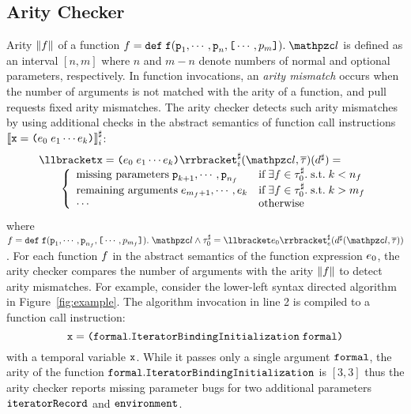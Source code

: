 \subsection{Arity Checker}

Arity $\lVert{f}\rVert$ of a function $\func = \kwdef \; \f (\p_1, \cdots, \p_n,
\kwsl \cdots, p_m \kwsr). \; \lab$ is defined as an interval $[n, m]$ where $n$
and $m-n$ denote numbers of normal and optional parameters, respectively.  In
function invocations, an \textit{arity mismatch} occurs when the number of
arguments is not matched with the arity of a function, and  pull
requests fixed  arity mismatches.  The arity checker detects such
arity mismatches by using additional checks in the abstract semantics of
function call instructions ${\llbracket{\texttt{x}= \texttt{(}e_0 \; e_1 \cdots e_k
\texttt{)}}\rrbracket}^\sharp_i$:
\[
  \begin{array}{l}
    \asemi{\x = \kwrl \expr_0 \; \expr_1 \cdots \expr_k \kwrr}(\lab,
    \tys)(\aelem) =\\
    \qquad \left\{
      \begin{array}{ll}
        \text{missing parameters} \; \p_{k+1}, \cdots, \p_{n_\func} &
        \text{if} \; \exists \func \in \aty_0. \; \text{s.t.} \; k < n_\func\\

        \text{remaining arguments} \; \expr_{m_\func+1}, \cdots, \expr_k &
        \text{if} \; \exists \func \in \aty_0. \; \text{s.t.} \; k > m_\func\\

        \cdots &
        \text{otherwise}\\
      \end{array}
    \right.\\
  \end{array}
\]
where $\func = \kwdef \; \f (\p_1, \cdots, \p_{n_\func}, \kwsl \cdots,
p_{m_\func} \kwsr). \; \lab \wedge \aty_0 = \aseme{\expr_0}(\aelem(\lab,
\tys))$.  For each function $f$ in the abstract semantics of the function
expression $e_0$, the arity checker compares the number of arguments with
the arity $\lVert{f}\rVert$ to detect arity mismatches.  For example, consider the
lower-left syntax directed algorithm in Figure~\ref{fig:example}.  The algorithm
invocation in line 2 is compiled to a function call instruction:
\[
  \texttt{x} = \texttt{(} \texttt{formal}.\texttt{IteratorBindingInitialization} \; \texttt{formal}
  \texttt{)}
\]
with a temporal variable $\texttt{x}$.  While it passes only a single argument
$\texttt{formal}$, the arity of the function
$\texttt{formal}.\texttt{IteratorBindingInitialization}$ is $[3, 3]$ thus the arity
checker reports missing parameter bugs for two additional parameters
$\texttt{iteratorRecord}$ and $\texttt{environment}$.


